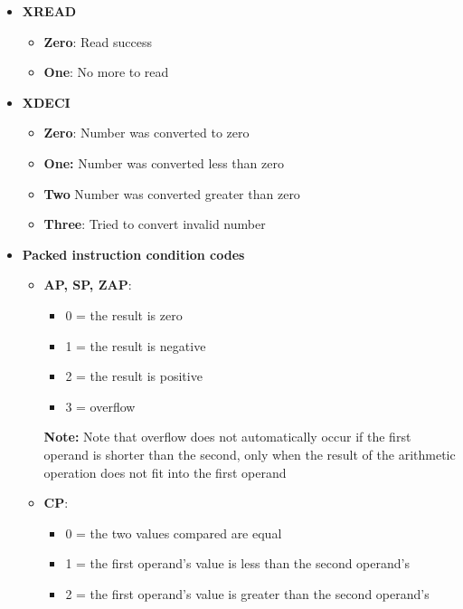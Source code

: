 \documentclass{report}
\begin{document}
\begin{itemize}
\begin{itemize}
            \end{itemize}
        \item \textbf{XREAD}
            \begin{itemize}
                \item \textbf{Zero}: Read success
                \item \textbf{One}: No more to read
            \end{itemize}
        \item \textbf{XDECI}
            \begin{itemize}
                \item \textbf{Zero}: Number was converted to zero
                \item \textbf{One:} Number was converted less than zero
                \item \textbf{Two} Number was converted greater than zero
                \item \textbf{Three}: Tried to convert invalid number
            \end{itemize}
        \item \textbf{Packed instruction condition codes}
            \begin{itemize}
                \item \textbf{AP, SP, ZAP}:
                    \begin{itemize}
                        \item 0 = the result is zero
                        \item 1 = the result is negative
                        \item 2 = the result is positive
                        \item 3 = overflow
                    \end{itemize}
                    \bigbreak \noindent 
                    \textbf{Note:} Note that overflow does not automatically occur if the first operand is shorter than the second, only when the result of the arithmetic operation does not fit into the first operand
                \item \textbf{CP}:
                    \begin{itemize}
                        \item 0 = the two values compared are equal
                        \item 1 = the first operand's value is less than the second operand's
                        \item 2 = the first operand's value is greater than the second operand's

\end{itemize}
\end{itemize}
\end{itemize}
\end{document}

